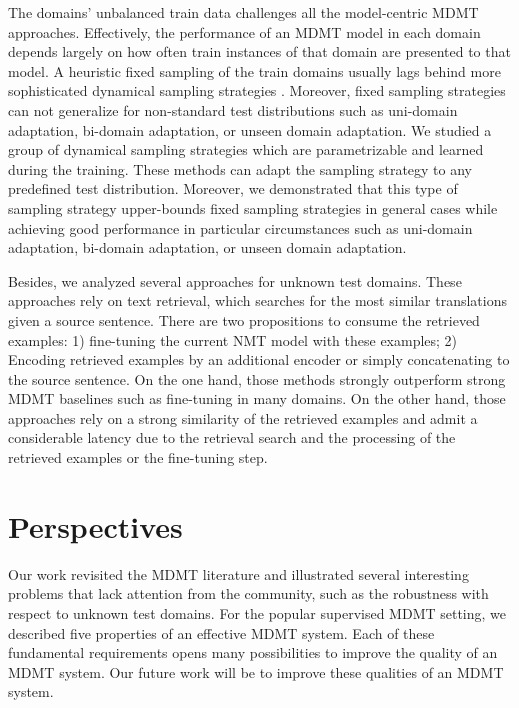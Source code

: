 The domains' unbalanced train data challenges all the model-centric MDMT approaches. Effectively, the performance of an MDMT model in each domain depends largely on how often train instances of that domain are presented to that model. A heuristic fixed sampling of the train domains usually lags behind more sophisticated dynamical sampling strategies \citep{Wang20balancing}. Moreover, fixed sampling strategies can not generalize for non-standard test distributions such as uni-domain adaptation, bi-domain adaptation, or unseen domain adaptation. We studied a group of dynamical sampling strategies which are parametrizable and learned during the training. These methods can adapt the sampling strategy to any predefined test distribution. Moreover, we demonstrated that this type of sampling strategy upper-bounds fixed sampling strategies in general cases while achieving good performance in particular circumstances such as uni-domain adaptation, bi-domain adaptation, or unseen domain adaptation.

Besides, we analyzed several approaches for unknown test domains. These approaches rely on text retrieval, which searches for the most similar translations given a source sentence. There are two propositions to consume the retrieved examples: 1) fine-tuning the current NMT model with these examples; 2) Encoding retrieved examples by an additional encoder or simply concatenating to the source sentence. On the one hand, those methods strongly outperform strong MDMT baselines such as fine-tuning in many domains. On the other hand, those approaches rely on a strong similarity of the retrieved examples and admit a considerable latency due to the retrieval search and the processing of the retrieved examples or the fine-tuning step.

\section*{Perspectives}

Our work revisited the MDMT literature and illustrated several interesting problems that lack attention from the community, such as the robustness with respect to unknown test domains. For the popular supervised MDMT setting, we described five properties of an effective MDMT system. Each of these fundamental requirements opens many possibilities to improve the quality of an MDMT system. Our future work will be to improve these qualities of an MDMT system.

